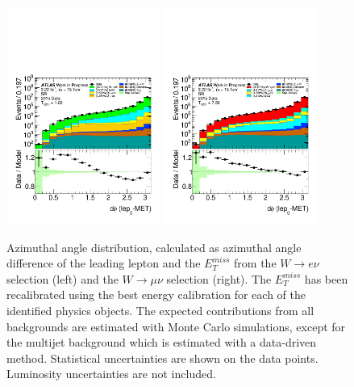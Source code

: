 \begin{figure}[htbp]
\centering
\includegraphics[width=0.45\textwidth]{figures/SR/dataMc-lepmet_dphi-SR-bkgQCD-el-log.pdf}
\includegraphics[width=0.45\textwidth]{figures/SR/dataMc-lepmet_dphi-SR-bkgQCD-mu-log.pdf}
\caption{
Azimuthal angle distribution, calculated as azimuthal angle difference of the leading lepton and the $E_{T}^{miss}$ from the $W \rightarrow e\nu$ selection (left) and the $W \rightarrow \mu\nu$ selection (right).
The $E_{T}^{miss}$ has been recalibrated using the best energy calibration for each of the identified physics objects.
The expected contributions from all backgrounds are estimated with Monte Carlo simulations, except for the multijet background which is estimated with a data-driven method. 
Statistical uncertainties are shown on the data points.
Luminosity uncertainties are not included.
}
\label{fig:SR_lepmet_dphi}
\end{figure}

